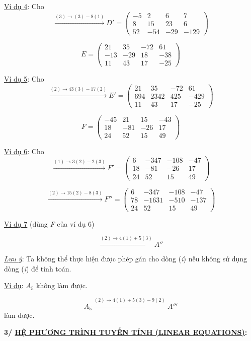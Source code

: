 \documentclass[12pt,a4paper]{article}
\let\ul\uline
\begin{document}
\ul{Ví dụ 4}: Cho $$\xrightarrow{(3) \rightarrow (3) - 8(1)} D' = \begin{pmatrix} -5 & 2 & 6 & 7 \\ 8 & 15 & 23 & 6 \\ 52 & -54 & -29 & -129 \end{pmatrix}$$

$$E = \begin{pmatrix} 21 & 35 & -72 & 61 \\ -13 & -29 & 18 & -38 \\ 11 & 43 & 17 & -25 \end{pmatrix}$$

\ul{Ví dụ 5}: Cho $$\xrightarrow{(2) \rightarrow 43(3) - 17(2)} E' = \begin{pmatrix} 21 & 35 & -72 & 61 \\ 694 & 2342 & 425 & -429 \\ 11 & 43 & 17 & -25 \end{pmatrix}$$

$$F = \begin{pmatrix} -45 & 21 & 15 & -43 \\ 18 & -81 & -26 & 17 \\ 24 & 52 & 15 & 49 \end{pmatrix}$$

\ul{Ví dụ 6}: Cho $$\xrightarrow{(1) \rightarrow 3(2) - 2(3)} F' = \begin{pmatrix} 6 & -347 & -108 & -47 \\ 18 & -81 & -26 & 17 \\ 24 & 52 & 15 & 49 \end{pmatrix}$$

$$\xrightarrow{(2) \rightarrow 15(2) - 8(3)} F'' = \begin{pmatrix} 6 & -347 & -108 & -47 \\ 78 & -1631 & -510 & -137 \\ 24 & 52 & 15 & 49 \end{pmatrix}$$

\ul{Ví dụ 7} (dùng \emph{F} của ví dụ 6)

$$\xrightarrow{(2) \rightarrow 4(1) + 5(3)} A''$$

\emph{\ul{Lưu ý}}: Ta không thể thực hiện được phép gán cho dòng
(\emph{i}) nếu không sử dụng dòng (\emph{i}) để tính toán.

\ul{Ví dụ}: $A_5$ không làm được.

$$A_5 \xrightarrow{(2) \rightarrow 4(1) + 5(3) - 9(2)} A'''$$ làm được.

\textbf{3/ \ul{HỆ PHƯƠNG TRÌNH TUYẾN TÍNH (LINEAR EQUATIONS)}:}
\end{document}
